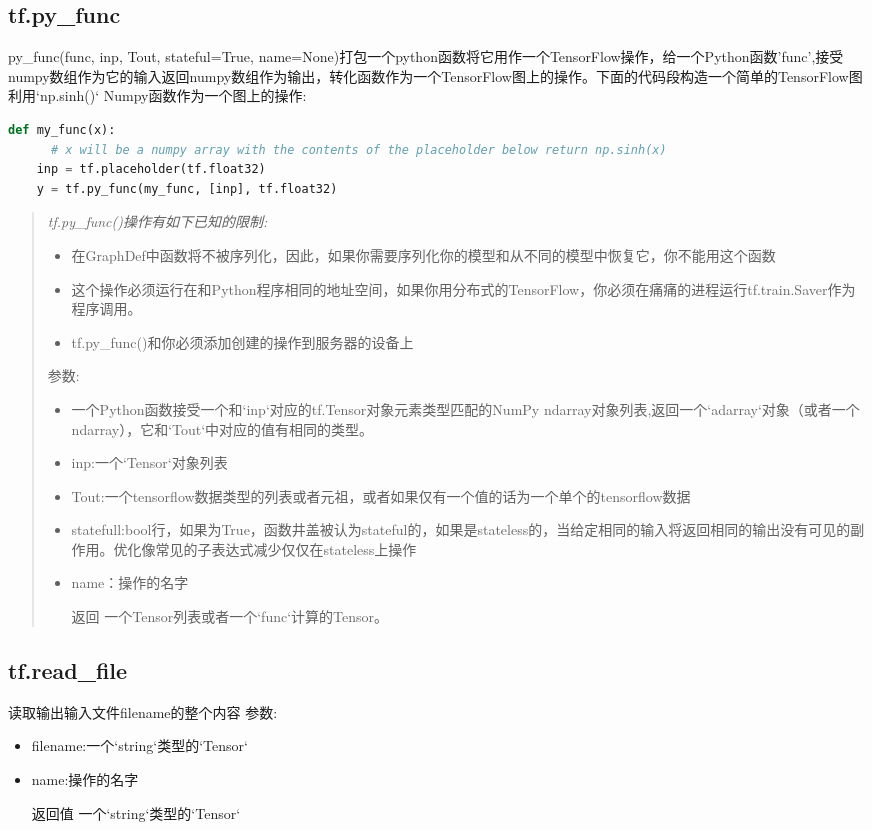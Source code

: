 \subsection{tf.py\_func}
py\_func(func, inp, Tout, stateful=True, name=None)打包一个python函数将它用作一个TensorFlow操作，给一个Python函数'func',接受numpy数组作为它的输入返回numpy数组作为输出，转化函数作为一个TensorFlow图上的操作。下面的代码段构造一个简单的TensorFlow图利用`np.sinh()` Numpy函数作为一个图上的操作:
\begin{lstlisting}[language=Python]
 def my_func(x):
      # x will be a numpy array with the contents of the placeholder below return np.sinh(x)
    inp = tf.placeholder(tf.float32)
    y = tf.py_func(my_func, [inp], tf.float32)
\end{lstlisting}
\begin{quote}
	\emph{tf.py\_func()操作有如下已知的限制:}
	\begin{itemize}
			\item 在GraphDef中函数将不被序列化，因此，如果你需要序列化你的模型和从不同的模型中恢复它，你不能用这个函数
			\item 这个操作必须运行在和Python程序相同的地址空间，如果你用分布式的TensorFlow，你必须在痛痛的进程运行tf.train.Saver作为程序调用。
			\item tf.py\_func()和你必须添加创建的操作到服务器的设备上
	\end{itemize}
参数:
\begin{itemize}
		\item 一个Python函数接受一个和`inp`对应的tf.Tensor对象元素类型匹配的NumPy ndarray对象列表,返回一个`adarray`对象（或者一个ndarray），它和`Tout`中对应的值有相同的类型。
		\item inp:一个`Tensor`对象列表
		\item Tout:一个tensorflow数据类型的列表或者元祖，或者如果仅有一个值的话为一个单个的tensorflow数据
		\item statefull:bool行，如果为True，函数井盖被认为stateful的，如果是stateless的，当给定相同的输入将返回相同的输出没有可见的副作用。优化像常见的子表达式减少仅仅在stateless上操作
		\item name：操作的名字
		\item[返回] 一个Tensor列表或者一个`func`计算的Tensor。
\end{itemize}
\end{quote}
\subsection{tf.read\_file}
读取输出输入文件filename的整个内容
参数:
\begin{itemize}
		\item filename:一个`string`类型的`Tensor`
		\item name:操作的名字
		\item[返回值] 一个`string`类型的`Tensor`
\end{itemize}
